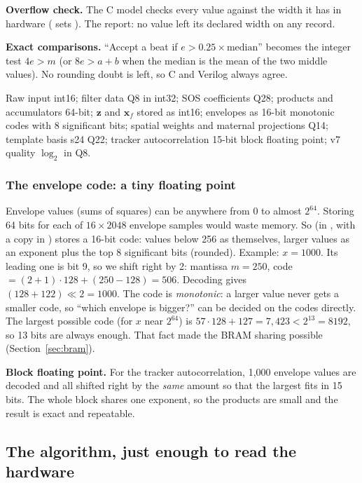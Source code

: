 \documentclass[11pt]{article}
\newcommand{\mods}[1]{\texttt{\detokenize{#1}}}   %
\begin{document}
\textbf{Overflow check.} The C model checks every value against the width it has in hardware (\mods{chk(v, bits)} sets \mods{fm_overflow}). The report: no value left its declared width on any record.

\textbf{Exact comparisons.} ``Accept a beat if $e > 0.25 \times \text{median}$'' becomes the integer test $4e > m$ (or $8e > a + b$ when the median is the mean of the two middle values). No rounding doubt is left, so C and Verilog always agree.

\begin{keyfact}[Number formats of v6 (C model = RTL)]
Raw input int16; filter data Q8 in int32; SOS coefficients Q28; products and accumulators 64-bit; $\mathbf{z}$ and $\mathbf{x}_f$ stored as int16; envelopes as 16-bit monotonic codes with 8 significant bits; spatial weights and maternal projections Q14; template basis s24 Q22; tracker autocorrelation 15-bit block floating point; v7 quality $\log_2$ in Q8.
\end{keyfact}

\subsubsection*{The envelope code: a tiny floating point}
Envelope values (sums of squares) can be anywhere from 0 to almost $2^{64}$. Storing 64 bits for each of $16 \times 2048$ envelope samples would waste memory. So \mods{enc_e} (in , with a copy in \mods{v6_trk}) stores a 16-bit code: values below 256 as themselves, larger values as an exponent plus the top 8 significant bits (rounded). Example: $x = 1000$. Its leading one is bit 9, so we shift right by 2: mantissa $m = 250$, code $= (2+1)\cdot128 + (250 - 128) = 506$. Decoding gives $(128 + 122) \ll 2 = 1000$. The code is \emph{monotonic}: a larger value never gets a smaller code, so ``which envelope is bigger?'' can be decided on the codes directly. The largest possible code (for $x$ near $2^{64}$) is $57\cdot128 + 127 = 7{,}423 < 2^{13} = 8192$, so 13 bits are always enough. That fact made the BRAM sharing possible (Section~\ref{sec:bram}).

\textbf{Block floating point.} For the tracker autocorrelation, 1,000 envelope values are decoded and all shifted right by the \emph{same} amount so that the largest fits in 15 bits. The whole block shares one exponent, so the products are small and the result is exact and repeatable.

\subsection{The algorithm, just enough to read the hardware}
\end{document}
